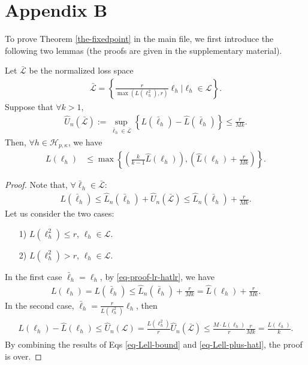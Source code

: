 \documentclass[10pt]{llncs}
\begin{document}
\section{Appendix B}
To prove Theorem \ref{the-fixedpoint} in the main file, we first introduce the following two lemmas (the proofs are given in the supplementary material).
\begin{lemma}
\label{the-ori-bound}
   Let $\bar{\mathcal{L}}$ be the normalized loss space
  \begin{align}
    \label{eq-ell-r}
    \bar{\mathcal{L}}=\left\{
        \frac{r}{\max(L(\ell_h^2),r)}\ell_h\Big| \ell_h\in \mathcal{L}
    \right\}.
  \end{align}
   Suppose that $\forall k>1$,
   \begin{align*}
     \hat{U}_n({\bar{\mathcal{L}}})
     :=\sup_{\bar{\ell}_h\in\bar{\mathcal{L}}}\left\{L(\bar{\ell}_h)-\hat{L}(\bar{\ell}_h)\right\}
     \leq \frac{r}{Mk}.
   \end{align*}
   Then, $\forall h\in\mathcal{H}_{p,\kappa}$, we have
   \begin{align*}
     L(\ell_h)&\leq \max\left\{
        \left(\frac{k}{k-1}\hat{L}(\ell_h)
        \right),
        \left(\hat{L}(\ell_h)+\frac{r}{Mk}
        \right)
     \right\}.
   \end{align*}
\end{lemma}
\begin{proof}
  Note that, $\forall \bar{\ell}_h\in{\bar{\mathcal{L}}}$:
  \begin{align}
    \label{eq-proof-lr-hatlr}
    L(\bar{\ell}_h)\leq \hat{L}_{n}(\bar{\ell}_h)
    +\hat{U}_n({\bar{\mathcal{L}}})\leq \hat{L}_n(\bar{\ell}_h)+\frac{r}{Mk}.
  \end{align}
  Let us consider the two cases:
  \begin{itemize}
    \item[1)] $L(\ell_h^2)\leq r$, $\ell_h\in\mathcal{L}$.
    \item[2)] $L(\ell_h^2)>r$, $\ell_h\in\mathcal{L}$.
  \end{itemize}
  In the first case $\bar{\ell}_h=\ell_h$,
  by \eqref{eq-proof-lr-hatlr},
  we have
  \begin{align}
    \label{eq-Lell-bound}
    L(\ell_h)=L(\bar{\ell}_h)\leq \hat{L}_n(\bar{\ell}_h)+\frac{r}{Mk}
    =\hat{L}(\ell_h)+\frac{r}{Mk}.
  \end{align}
  In the second case, $\bar{\ell}_h=\frac{r}{L(\ell_h^2)}\ell_h$,
  then
  \begin{align}
    \label{eq-Lell-plus-hatl}
    \begin{aligned}
    L(\ell_h)-\hat{L}(\ell_h)
    \leq \hat{U}_n(\mathcal{L})
    =\frac{L(\ell_h^2)}{r}\hat{U}_n(\bar{\mathcal{L}})
    \leq\frac{M\cdot L(\ell_h)}{r}\frac{r}{Mk}=\frac{L(\ell_h)}{k}.
    \end{aligned}
  \end{align}
  By combining the results of Eqs \eqref{eq-Lell-bound} and \eqref{eq-Lell-plus-hatl},
  the proof is over.
\end{proof}
\end{document}
